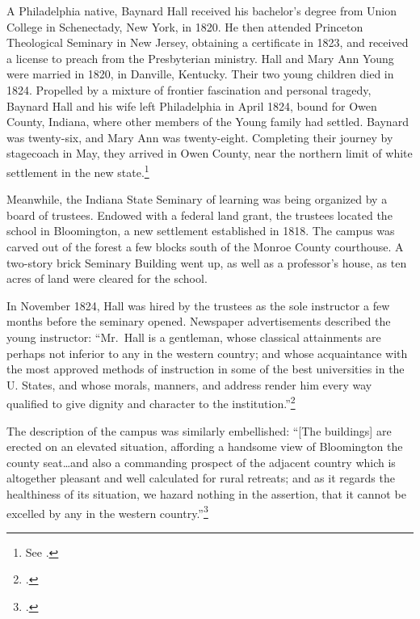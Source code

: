 \documentclass[
  american,
  letterpaper,
]{scrreprt}
\begin{document}
A Philadelphia native, Baynard Hall received his bachelor's degree from
Union College in Schenectady, New York, in 1820. He then attended
Princeton Theological Seminary in New Jersey, obtaining a certificate in
1823, and received a license to preach from the Presbyterian ministry.
Hall and Mary Ann Young were married in 1820, in Danville, Kentucky.
Their two young children died in 1824. Propelled by a mixture of
frontier fascination and personal tragedy, Baynard Hall and his wife
left Philadelphia in April 1824, bound for Owen County, Indiana, where
other members of the Young family had settled. Baynard was twenty-six,
and Mary Ann was twenty-eight. Completing their journey by stagecoach in
May, they arrived in Owen County, near the northern limit of white
settlement in the new state.\footnote{See
  .}

Meanwhile, the Indiana State Seminary of learning was being organized by
a board of trustees. Endowed with a federal land grant, the trustees
located the school in Bloomington, a new settlement established in 1818.
The campus was carved out of the forest a few blocks south of the Monroe
County courthouse. A two-story brick Seminary Building went up, as well
as a professor's house, as ten acres of land were cleared for the
school.

In November 1824, Hall was hired by the trustees as the sole instructor
a few months before the seminary opened. Newspaper advertisements
described the young instructor: ``Mr.~Hall is a gentleman, whose
classical attainments are perhaps not inferior to any in the western
country; and whose acquaintance with the most approved methods of
instruction in some of the best universities in the U. States, and whose
morals, manners, and address render him every way qualified to give
dignity and character to the institution.''\footnote{.}

The description of the campus was similarly embellished: ``{[}The
buildings{]} are erected on an elevated situation, affording a handsome
view of Bloomington the county seat\ldots and also a commanding prospect
of the adjacent country which is altogether pleasant and well calculated
for rural retreats; and as it regards the healthiness of its situation,
we hazard nothing in the assertion, that it cannot be excelled by any in
the western country.''\footnote{.}
\end{document}
